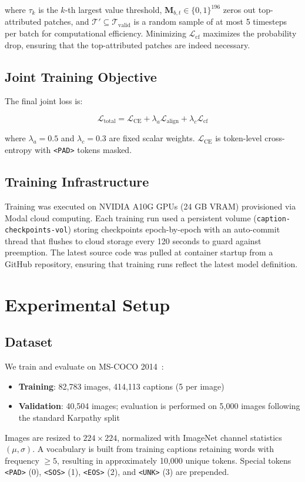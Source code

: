 \documentclass[conference]{IEEEtran}
\begin{document}
where $\tau_k$ is the $k$-th largest value threshold, $\mathbf{M}_{b,t} \in \{0,1\}^{196}$ zeros out top-attributed patches, and $\mathcal{T}' \subseteq \mathcal{T}_{\text{valid}}$ is a random sample of at most 5 timesteps per batch for computational efficiency. Minimizing $\mathcal{L}_{\text{cf}}$ maximizes the probability drop, ensuring that the top-attributed patches are indeed necessary.

\subsection{Joint Training Objective}

The final joint loss is:

\begin{equation}
    \mathcal{L}_{\text{total}} = \mathcal{L}_{\text{CE}} + \lambda_a \mathcal{L}_{\text{align}} + \lambda_c \mathcal{L}_{\text{cf}}
    \label{eq:total_loss}
\end{equation}

where $\lambda_a = 0.5$ and $\lambda_c = 0.3$ are fixed scalar weights. $\mathcal{L}_{\text{CE}}$ is token-level cross-entropy with \texttt{<PAD>} tokens masked.

\subsection{Training Infrastructure}

Training was executed on NVIDIA A10G GPUs (24 GB VRAM) provisioned via Modal cloud computing. Each training run used a persistent volume (\texttt{caption-checkpoints-vol}) storing checkpoints epoch-by-epoch with an auto-commit thread that flushes to cloud storage every 120 seconds to guard against preemption. The latest source code was pulled at container startup from a GitHub repository, ensuring that training runs reflect the latest model definition.

\section{Experimental Setup}
\label{sec:exp}

\subsection{Dataset}

We train and evaluate on MS-COCO 2014~\cite{b16}:
\begin{itemize}
    \item \textbf{Training}: 82,783 images, 414,113 captions (5 per image)
    \item \textbf{Validation}: 40,504 images; evaluation is performed on 5,000 images following the standard Karpathy split
\end{itemize}
Images are resized to $224\times224$, normalized with ImageNet channel statistics $(\mu, \sigma)$. A vocabulary is built from training captions retaining words with frequency $\geq 5$, resulting in approximately 10,000 unique tokens. Special tokens \texttt{<PAD>} (0), \texttt{<SOS>} (1), \texttt{<EOS>} (2), and \texttt{<UNK>} (3) are prepended.
\end{document}
